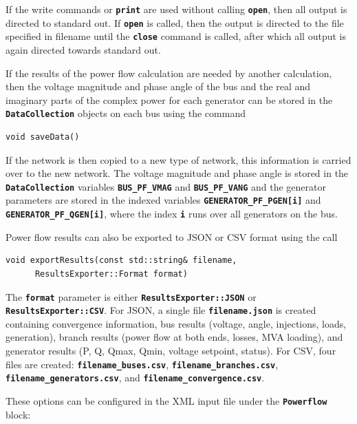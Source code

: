 If the write commands or \texttt{\textbf{print}} are used without calling \texttt{\textbf{open}}, then all output is directed to standard out. If \texttt{\textbf{open}} is called, then the output is directed to the file specified in filename until the \texttt{\textbf{close}} command is called, after which all output is again directed towards standard out.

If the results of the power flow calculation are needed by another calculation, then the voltage magnitude and phase angle of the bus and the real and imaginary parts of the complex power for each generator can be stored in the \texttt{\textbf{DataCollection}} objects on each bus using the command

{
\color{red}
\begin{Verbatim}[fontseries=b]
void saveData()
\end{Verbatim}
}

If the network is then copied to a new type of network, this information is carried over to the new network. The voltage magnitude and phase angle is stored in the \texttt{\textbf{DataCollection}} variables \texttt{\textbf{BUS\_PF\_VMAG}} and \texttt{\textbf{BUS\_PF\_VANG}} and the generator parameters are stored in the indexed variables \texttt{\textbf{GENERATOR\_PF\_PGEN[i]}} and \texttt{\textbf{GENERATOR\_PF\_QGEN[i]}}, where the index \texttt{\textbf{i}} runs over all generators on the bus.

Power flow results can also be exported to JSON or CSV format using the call

{
\color{red}
\begin{Verbatim}[fontseries=b]
void exportResults(const std::string& filename,
      ResultsExporter::Format format)
\end{Verbatim}
}

The \texttt{\textbf{format}} parameter is either \texttt{\textbf{ResultsExporter::JSON}} or \texttt{\textbf{ResultsExporter::CSV}}. For JSON, a single file \texttt{\textbf{filename.json}} is created containing convergence information, bus results (voltage, angle, injections, loads, generation), branch results (power flow at both ends, losses, MVA loading), and generator results (P, Q, Qmax, Qmin, voltage setpoint, status). For CSV, four files are created: \texttt{\textbf{filename\_buses.csv}}, \texttt{\textbf{filename\_branches.csv}}, \texttt{\textbf{filename\_generators.csv}}, and \texttt{\textbf{filename\_convergence.csv}}.

These options can be configured in the XML input file under the \texttt{\textbf{Powerflow}} block:

